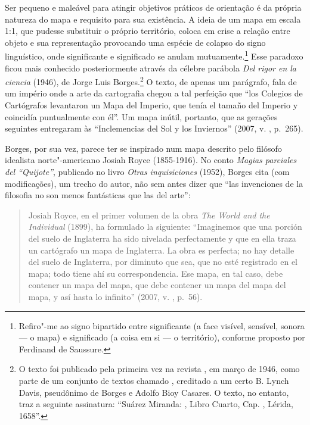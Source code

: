 Ser pequeno e maleável para atingir objetivos práticos de orientação é \label{escala}
da própria natureza do mapa e requisito para sua existência. A ideia de
um mapa em escala 1:1, que pudesse substituir o próprio território,
coloca em crise a relação entre objeto e sua representação provocando
uma espécie de colapso do signo linguístico, onde significante e
significado se anulam mutuamente.\footnote{Refiro"-me ao signo bipartido
  entre significante (a face visível, sensível, sonora --- o mapa) e
  significado (a coisa em si --- o território), conforme proposto por
  Ferdinand de Saussure.} Esse paradoxo ficou mais conhecido
posteriormente através da célebre parábola \emph{Del rigor en la
ciencia} (1946), de Jorge Luis Borges.\footnote{O texto foi publicado
  pela primeira vez na revista {}, em
  março de 1946, como parte de um conjunto de textos chamado
  {}, creditado a um certo B. Lynch Davis, pseudônimo de
  Borges e Adolfo Bioy Casares. O texto, no entanto, traz a seguinte
  assinatura: ``Suárez Miranda: {},
  Libro Cuarto, Cap. , Lérida, 1658''.} O texto, de apenas um parágrafo, fala de um império onde a arte da cartografia
chegou a tal perfeição que ``los Colegios de Cartógrafos levantaron un
Mapa del Imperio, que tenía el tamaño del Imperio y coincidía
puntualmente con él''. Um mapa inútil, portanto, que as gerações
seguintes entregaram às ``Inclemencias del Sol y los Inviernos'' (2007,
v. , p.~265).

Borges, por sua vez, parece ter se inspirado num mapa descrito pelo
filósofo idealista norte"-americano Josiah Royce (1855-1916). No conto
\emph{Magias parciales del ``Quijote''}, publicado no livro \emph{Otras
inquisiciones} (1952), Borges cita (com modificações), um trecho do
autor, não sem antes dizer que ``las invenciones de la filosofia no son
menos fantásticas que las del arte'':

\begin{quote}
Josiah Royce, en el primer volumen de la obra \emph{The World and the
Individual} (1899), ha formulado la siguiente: ``Imaginemos que una
porción del suelo de Inglaterra ha sido nivelada perfectamente y que en
ella traza un cartógrafo un mapa de Inglaterra. La obra es perfecta; no
hay detalle del suelo de Inglaterra, por diminuto que sea, que no esté
registrado en el mapa; todo tiene ahí su correspondencia. Ese mapa, en
tal caso, debe contener un mapa del mapa, que debe contener un mapa del
mapa del mapa, y así hasta lo infinito'' (2007, v. , p.~56).
\end{quote}

